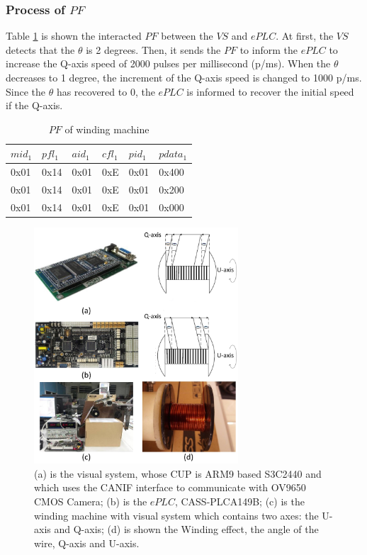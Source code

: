 \documentclass[journal,UTF8]{IEEEtran}
\begin{document}
\subsubsection{Process of $PF$}
Table \ref{table:PFofWinding} is shown the interacted $PF$ between the $VS$ and $ePLC$. At first, the $VS$ detects that the $\theta$ is 2 degrees. Then, it sends the $PF$ to inform the $ePLC$ to increase the Q-axis speed of 2000 pulses per millisecond (p/ms). When the $\theta$ decreases to 1 degree, the increment of the Q-axis speed is changed to 1000 p/ms. Since the $\theta$ has recovered to 0, the $ePLC$ is informed to recover the initial speed if the Q-axis.  
\begin{table}
	\scriptsize \caption{$PF$ of winding machine}
	\label{table:PFofWinding}
	\begin{center}
		\renewcommand{\arraystretch}{1.4}
		\setlength\tabcolsep{3pt}
		\begin{tabular}{|p{1.2cm}|p{1.2cm}|p{1.2cm}|p{1.2cm}|p{1.2cm}|p{1cm}|}
			\hline
			$mid_1$   & $pfl_1$ &$aid_1$ & $cfl_1$  & $pid_1$  &$pdata_1$   \\
			\hline
			0x01    & 0x14  &0x01  &0xE     &0x01   &0x400   \\
			\hline
			0x01    & 0x14  &0x01  &0xE     &0x01   &0x200   \\
			\hline
			0x01    & 0x14  &0x01  &0xE     &0x01   &0x000   \\
			\hline
		\end{tabular}
	\end{center}
\end{table}
\begin{figure}
	\centering
	\includegraphics[width=3in]{fig/Winding.pdf}
	\caption{ (a) is the visual system, whose CUP is ARM9 based S3C2440 and which uses the CANIF interface to communicate with OV9650 CMOS Camera; (b) is the $ePLC$, CASS-PLCA149B; (c) is the winding machine with visual system which contains two axes: the U-axis and Q-axis; (d) is shown the Winding effect, the angle of the wire, Q-axis and U-axis.}
	\label{fig:Winding}
\end{figure}
\end{document}
